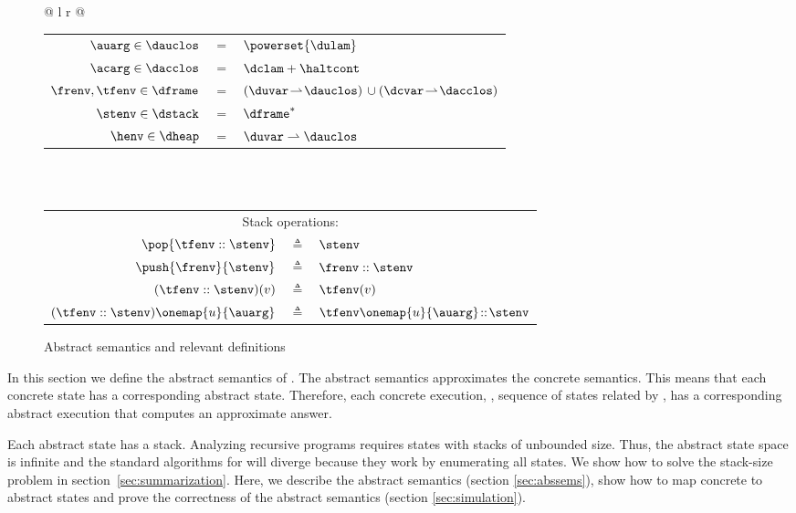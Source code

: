 \documentclass{LMCS}
\theoremstyle{definition} \newtheorem{property}[thm]{Property}
\begin{document}
\begin{figure}[!t]
{\begin{tabular}{@{} l r @{}}
{\begin{tabular}{@{} r @{\,} c @{\:} l @{}}
          \\
          $\auarg \in \dauclos$ & $=$ &  $\powerset{\dulam}$ 
          \\
          $\acarg \in \dacclos$ & $=$ & $\dclam + \haltcont$
          \\
          $\frenv, \tfenv \in \dframe$ & $=$ &
          $(\duvar \!\rightharpoonup\! \dauclos) \,\cup
          (\dcvar \!\rightharpoonup\! \dacclos)$ 
          \\
          $\stenv \in \dstack$ & $=$ & $\dframe^*$ 
          \\
          $\henv \in \dheap$ & $=$ & $\duvar \rightharpoonup \dauclos$
        \end{tabular}
        \\ \\
        \begin{tabular}{@{$\quad$} r @{\;\;} p{0.1cm} @{\;\;\;} l}
          \multicolumn{3}{c}{Stack operations:}
          \\ 
          $\pop{\tfenv::\stenv}$ & $\triangleq$ & $\stenv$ \rule{0cm}{0.45cm}
          \\ 
          $\push{\frenv}{\stenv}$ & $\triangleq$ & $\frenv::\stenv$ 
          \rule{0cm}{0.45cm}
          \\ 
          $(\tfenv::\stenv)(v)$ & $\triangleq$ & $\tfenv(v)$ \rule{0cm}{0.45cm}
          \\ 
          $(\tfenv::\stenv)\onemap{u}{\auarg}$ & $\triangleq$ &
          $\tfenv\onemap{u}{\auarg}\!::\!\stenv$ \rule{0cm}{0.45cm}      
        \end{tabular}
      }
    \end{tabular}
  }  
  \caption{Abstract semantics and relevant definitions \label{fig:abssems}}
\end{figure}

\noindent In this section we define the abstract semantics of \cfat.
The abstract semantics approximates the concrete semantics.
This means that each concrete state has a corresponding abstract state.
Therefore, each concrete execution, \ie, sequence of states related by \cstep,
has a corresponding abstract execution that computes an approximate answer.

Each abstract state has a stack.
Analyzing recursive programs requires states with stacks of unbounded size.
Thus, the abstract state space is infinite and the standard algorithms for 
\kcfa{} \cite{diss/cmu/91/olin, diss/07/might/dcfa} will diverge because they
work by enumerating all states.
We show how to solve the stack-size problem in section~\ref{sec:summarization}.
Here, we describe the abstract semantics (section \ref{sec:abssems}), show how
to map concrete to abstract states and prove the correctness of the abstract
semantics (section \ref{sec:simulation}).
\end{document}

